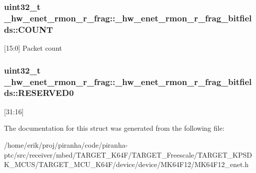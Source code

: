 \subsubsection[{\texorpdfstring{C\+O\+U\+NT}{COUNT}}]{\setlength{\rightskip}{0pt plus 5cm}uint32\+\_\+t \+\_\+hw\+\_\+enet\+\_\+rmon\+\_\+r\+\_\+frag\+::\+\_\+hw\+\_\+enet\+\_\+rmon\+\_\+r\+\_\+frag\+\_\+bitfields\+::\+C\+O\+U\+NT}\hypertarget{struct__hw__enet__rmon__r__frag_1_1__hw__enet__rmon__r__frag__bitfields_ac6b575177c35c8a0fd0f1bdb0a213126}{}\label{struct__hw__enet__rmon__r__frag_1_1__hw__enet__rmon__r__frag__bitfields_ac6b575177c35c8a0fd0f1bdb0a213126}
\mbox{[}15\+:0\mbox{]} Packet count 
\subsubsection[{\texorpdfstring{R\+E\+S\+E\+R\+V\+E\+D0}{RESERVED0}}]{\setlength{\rightskip}{0pt plus 5cm}uint32\+\_\+t \+\_\+hw\+\_\+enet\+\_\+rmon\+\_\+r\+\_\+frag\+::\+\_\+hw\+\_\+enet\+\_\+rmon\+\_\+r\+\_\+frag\+\_\+bitfields\+::\+R\+E\+S\+E\+R\+V\+E\+D0}\hypertarget{struct__hw__enet__rmon__r__frag_1_1__hw__enet__rmon__r__frag__bitfields_a56e9fb1762ce352958fdc4fdeb4df10b}{}\label{struct__hw__enet__rmon__r__frag_1_1__hw__enet__rmon__r__frag__bitfields_a56e9fb1762ce352958fdc4fdeb4df10b}
\mbox{[}31\+:16\mbox{]} 

The documentation for this struct was generated from the following file\+:\begin{DoxyCompactItemize}
\item 
/home/erik/proj/piranha/code/piranha-\/ptc/src/receiver/mbed/\+T\+A\+R\+G\+E\+T\+\_\+\+K64\+F/\+T\+A\+R\+G\+E\+T\+\_\+\+Freescale/\+T\+A\+R\+G\+E\+T\+\_\+\+K\+P\+S\+D\+K\+\_\+\+M\+C\+U\+S/\+T\+A\+R\+G\+E\+T\+\_\+\+M\+C\+U\+\_\+\+K64\+F/device/device/\+M\+K64\+F12/M\+K64\+F12\+\_\+enet.\+h\end{DoxyCompactItemize}

